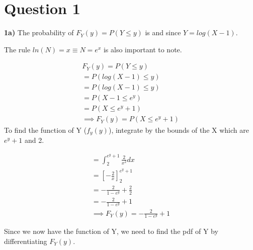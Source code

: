 \documentclass[oneside, a4paper]{article}
\begin{document}


\pagestyle{fancy}
\fancyhf{}

\newpage

\setcounter{secnumdepth}{-1}
\section{Question 1}

\textbf{1a)} The probability of $F_Y(y) = P(Y \leq y)$ is and since $Y = log(X - 1)$. 

The rule $ln(N) = x \equiv N = e^x$ is also important to note.

\begin{equation}
\begin{split}
F_Y(y) = P(Y\leq y) \\
= P(log(X-1)\leq y) \\
= P(log(X-1)\leq y) \\
= P(X - 1\leq e^y) \\
= P(X \leq e^y + 1) \\
\implies 
F_Y(y) = P(X \leq e^y + 1)
\end{split}
\end{equation}
To find the function of Y ($f_y(y)$), integrate by the bounds of the X which are $e^y + 1$ and 2.

\begin{equation}
\begin{split}
= \int_{2}^{e^y + 1} \frac{2}{x^2} dx \\
= \left[  -\frac{2}{x} \right]^{e^y + 1}_2 \\
= -\frac{2}{1 - e^y} + \frac{2}{2} \\
= -\frac{2}{1 - e^y} + 1 \\
\implies F_Y(y) = -\frac{2}{1 - e^y} + 1
\end{split}
\end{equation}

Since we now have the function of Y, we need to find the pdf of Y by differentiating $F_Y(y)$.
\end{document}

